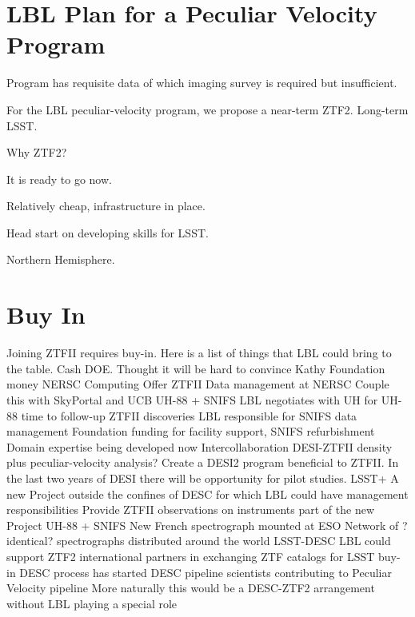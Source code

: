 \documentclass[11pt, oneside]{article}   	%
\begin{document}

\section{LBL Plan for a Peculiar Velocity Program}
Program has requisite data of which imaging survey is required but insufficient.

For the LBL peculiar-velocity program, we propose a near-term ZTF2.  Long-term LSST.

Why ZTF2?


It is ready to go now.

Relatively cheap, infrastructure in place.

Head start on developing skills for LSST.

Northern Hemisphere.



\section{Buy In}



Joining ZTFII requires buy-in.  Here is a list of things that LBL could bring to the table.
Cash
DOE.  Thought it will be hard to convince Kathy
Foundation money
NERSC Computing
Offer ZTFII Data management at NERSC
Couple this with SkyPortal and UCB
UH-88 + SNIFS
LBL negotiates with UH for UH-88 time to follow-up ZTFII discoveries
LBL responsible for SNIFS data management
Foundation funding for facility support, SNIFS refurbishment
Domain expertise being developed now
Intercollaboration DESI-ZTFII density plus peculiar-velocity analysis?
Create a DESI2 program beneficial to ZTFII.   In the last two years of DESI there will be opportunity for pilot studies.
LSST+
A new Project outside the confines of DESC for which LBL could have management responsibilities
Provide ZTFII observations on instruments part of the new Project
UH-88 + SNIFS
New French spectrograph mounted at ESO
Network of ?identical? spectrographs distributed around the world
LSST-DESC
LBL could support ZTF2 international partners in exchanging ZTF catalogs for LSST buy-in
DESC process has started
DESC pipeline scientists contributing to Peculiar Velocity pipeline
More naturally this would be a DESC-ZTF2 arrangement without LBL playing a special role
\end{document}
